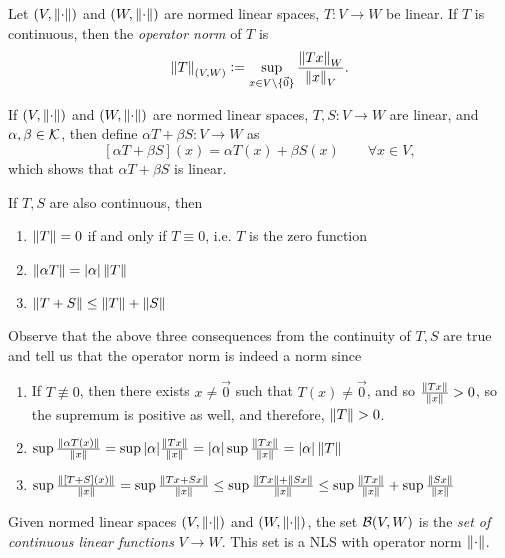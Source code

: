 \begin{definition}
\label{def:operator-norm}
Let $(V, \left\lVert\cdot\right\rVert)$ and $(W, \left\lVert\cdot\right\rVert)$ are normed linear spaces, $T: V \rightarrow W$ be linear. If $T$ is continuous, then the \textit{operator norm} of $T$ is 
$$
\left\lVert T\right\rVert_{(V,W)} \vcentcolon= \sup_{x \in V\setminus\{\Vec{0}\}} \frac{\left\lVert Tx\right\rVert_W}{\left\lVert x\right\rVert_V}.
$$
\end{definition}

\begin{note*}
If $(V, \left\lVert\cdot\right\rVert)$ and $(W, \left\lVert\cdot\right\rVert)$ are normed linear spaces, $T, S: V \rightarrow W$ are linear, and $\alpha, \beta \in \mathcal{K}$, then define $\alpha T + \beta S: V \rightarrow W$ as
$$
[\alpha T + \beta S](x) = \alpha T(x) + \beta S(x) \quad \quad \forall x \in V,
$$
which shows that $\alpha T + \beta S$ is linear.

If $T, S$ are also continuous, then
\begin{enumerate}
    \item $\left\lVert T\right\rVert = 0$ if and only if $T \equiv 0$, i.e. $T$ is the zero function
    \item $\left\lVert\alpha T\right\rVert = |\alpha| \left\lVert T\right\rVert$
    \item $\left\lVert T + S\right\rVert \leq \left\lVert T\right\rVert + \left\lVert S\right\rVert$
\end{enumerate}

Observe that the above three consequences from the continuity of $T,S$ are true and tell us that the operator norm is indeed a norm since
\begin{enumerate}
    \item If $T \not\equiv 0$, then there exists $x \not= \Vec{0}$ such that $T(x) \not= \Vec{0}$, and so $\frac{\left\lVert Tx\right\rVert}{\left\lVert x\right\rVert} > 0$, so the supremum is positive as well, and therefore, $\left\lVert T\right\rVert > 0$.
    \item $\sup \frac{\left\lVert\alpha T(x)\right\rVert}{\left\lVert x\right\rVert} = \sup |\alpha| \frac{\left\lVert Tx\right\rVert}{\left\lVert x\right\rVert} = |\alpha| \sup \frac{\left\lVert Tx\right\rVert}{\left\lVert x\right\rVert} = |\alpha| \left\lVert T\right\rVert$
    \item $\sup \frac{\left\lVert[T+S](x)\right\rVert}{\left\lVert x\right\rVert} = \sup \frac{\left\lVert Tx + Sx\right\rVert}{\left\lVert x\right\rVert} \leq \sup \frac{\left\lVert Tx\right\rVert + \left\lVert Sx\right\rVert}{\left\lVert x\right\rVert} \leq \sup \frac{\left\lVert Tx\right\rVert}{\left\lVert x\right\rVert} + \sup \frac{\left\lVert Sx\right\rVert}{\left\lVert x\right\rVert}$
\end{enumerate}
\end{note*}

\begin{definition}
\label{def:continuous-linear-functionals}
Given normed linear spaces $(V, \left\lVert\cdot\right\rVert)$ and $(W, \left\lVert\cdot\right\rVert)$, the set $\mathcal{B}(V,W)$ is the \textit{set of continuous linear functions} $V \rightarrow W$. This set is a NLS with operator norm $\left\lVert\cdot\right\rVert$.
\end{definition}

